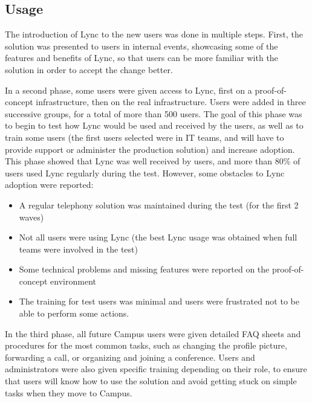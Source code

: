 \subsection{Usage}
 The introduction of Lync to the new users was done in multiple steps. First, the solution was presented to users in internal events, showcasing some of the features and benefits of Lync, so that users can be more familiar with the solution in order to accept the change better.
 
 In a second phase, some users were given access to Lync, first on a proof-of-concept infrastructure, then on the real infrastructure. Users were added in three successive groups, for a total of more than 500 users. The goal of this phase was to begin to test how Lync would be used and received by the users, as well as to train some users (the first users selected were in IT teams, and will have to provide support or administer the production solution) and increase adoption. This phase showed that Lync was well received by users, and more than 80\% of users used Lync regularly during the test. However, some obstacles to Lync adoption were reported: 
\begin{itemize}
	\item A regular telephony solution was maintained during the test (for the first 2 waves)
	\item Not all users were using Lync (the best Lync usage was obtained when full teams were involved in the test)
	\item Some technical problems and missing features were reported on the proof-of-concept environment
	\item The training for test users was minimal and users were frustrated not to be able to perform some actions.
\end{itemize}

In the third phase, all future Campus users were given detailed FAQ sheets and procedures for the most common tasks, such as changing the profile picture, forwarding a call, or organizing and joining a conference. Users and administrators were also given specific training depending on their role, to ensure that users will know how to use the solution and avoid getting stuck on simple tasks when they move to Campus.


